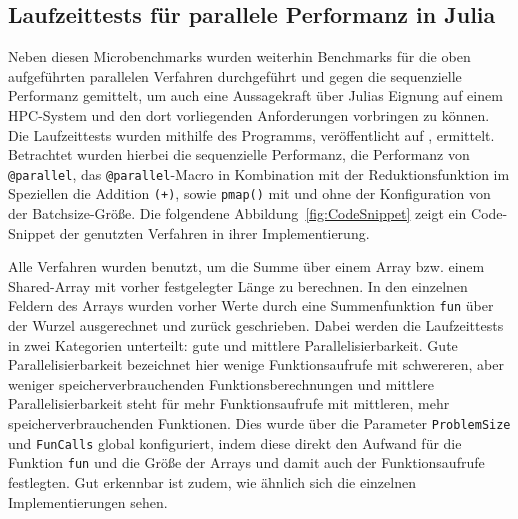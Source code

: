 \documentclass[proseminar,german,utf8]{zihpub}
\begin{document}
\subsection{Laufzeittests für parallele Performanz in Julia}

Neben diesen Microbenchmarks wurden weiterhin Benchmarks für die oben aufgeführten parallelen Verfahren durchgeführt und gegen die sequenzielle Performanz gemittelt, um auch eine Aussagekraft über Julias Eignung auf einem HPC-System und den dort vorliegenden Anforderungen vorbringen zu können. Die Laufzeittests wurden mithilfe des Programms, veröffentlicht auf \cite{JuliaCookbook}, ermittelt. Betrachtet wurden hierbei die sequenzielle Performanz, die Performanz von \verb|@parallel|, das \verb|@parallel|-Macro in Kombination mit der Reduktionsfunktion im Speziellen die Addition \verb|(+)|, sowie \verb|pmap()| mit und ohne der Konfiguration von der Batchsize-Größe. Die folgendene Abbildung~\ref{fig:CodeSnippet} zeigt ein Code-Snippet der genutzten Verfahren in ihrer Implementierung.

Alle Verfahren wurden benutzt, um die Summe über einem Array bzw. einem Shared-Array mit vorher festgelegter Länge zu berechnen. In den einzelnen Feldern des Arrays wurden vorher Werte durch eine Summenfunktion \verb|fun| über der Wurzel ausgerechnet und zurück geschrieben. Dabei werden die Laufzeittests in zwei Kategorien unterteilt: gute und mittlere Parallelisierbarkeit. Gute Parallelisierbarkeit bezeichnet hier wenige Funktionsaufrufe mit schwereren, aber weniger speicherverbrauchenden Funktionsberechnungen und mittlere Parallelisierbarkeit steht für mehr Funktionsaufrufe mit mittleren, mehr speicherverbrauchenden Funktionen. Dies wurde über die Parameter \verb|ProblemSize| und \verb|FunCalls| global konfiguriert, indem diese direkt den Aufwand für die Funktion \verb|fun| und die Größe der Arrays und damit auch der Funktionsaufrufe festlegten. Gut erkennbar ist zudem, wie ähnlich sich die einzelnen Implementierungen sehen. 
\end{document}

